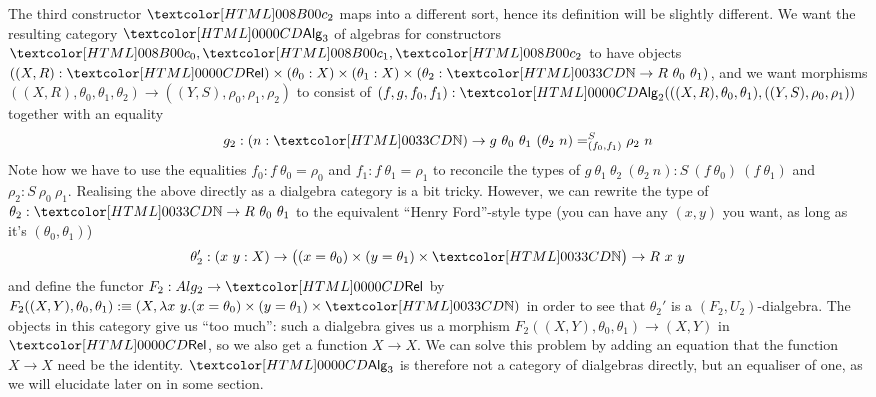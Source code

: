 The third constructor $\Bcii$ maps into a different sort, hence its
definition will be slightly different. We want the resulting category
$\Alg_3$ of algebras for constructors $\Aco, \Aci, \Bcii$ to have
objects
$((X,R) : \Rel) \times (\theta_0 : X) \times (\theta_1 : X) \times
(\theta_2 : \natty \to R\ \theta_0\ \theta_1)$,
and we want morphisms
$((X,R),\theta_0,\theta_1,\theta_2) \to ((Y,S),\rho_0,\rho_1,\rho_2)$
to consist of
$(f,g,f_0,f_1) :
\Alg_2(((X,R),\theta_0,\theta_1),((Y,S),\rho_0,\rho_1))$
together with an equality
$$
g_2 : (n : \natty)  \to \pathover{S}{(f_0,f_1)}{g\ \theta_0\ \theta_1\ (\theta_2\ n)}{\rho_2\ n}
$$
Note how we have to use the equalities $f_0 : f\ \theta_0 = \rho_0$ and
$f_1 : f\ \theta_1 = \rho_1$ to reconcile the types of
$g\ \theta_1\ \theta_2\ (\theta_2\ n) : S\ (f\ \theta_0)\ (f\
\theta_1)$ and $\rho_2 : S\ \rho_0\ \rho_1$.
%
Realising the above directly as a dialgebra category is a bit
tricky. However, we can rewrite the type of
$\theta_2 : \natty \to R\ \theta_0\ \theta_1$ to the equivalent ``Henry
Ford''-style type (you can have any $(x, y)$ you want, as long as it's
$(\theta_0, \theta_1)$)\
\[
\theta_2' : (x\ y : X) \to \big((x = \theta_0) \times (y = \theta_1) \times \natty\big) \to R\ x\ y 
\]
and define the functor $F_2 : Alg_2 \to \Rel$ by
$F_2 ((X,Y),\theta_0,\theta_1) \ddefeq (X , \lambda x\ y . (x =
\theta_0) \times (y = \theta_1) \times \natty)$
in order to see that $\theta_2'$ is a $(F_2,U_2)$-dialgebra. The
objects in this category give us ``too much'': such a dialgebra gives
us a morphism $F_2((X,Y),\theta_0,\theta_1) \to (X,Y)$ in $\Rel$, so
we also get a function $X \to X$. We can solve this problem by adding
an equation that the function $X \to X$ need be the identity. $\Alg_3$
is therefore not a category of dialgebras directly, but an equaliser
of one, as we will elucidate later on in some section.

